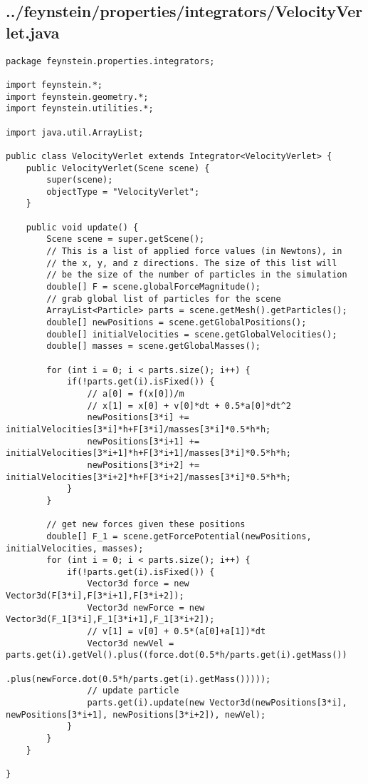 \subsection*{../feynstein/properties/integrators/VelocityVerlet.java}
\begin{lstlisting}
package feynstein.properties.integrators;

import feynstein.*;
import feynstein.geometry.*;
import feynstein.utilities.*;

import java.util.ArrayList;

public class VelocityVerlet extends Integrator<VelocityVerlet> {
    public VelocityVerlet(Scene scene) {
		super(scene);
		objectType = "VelocityVerlet";
    }
	
    public void update() {
		Scene scene = super.getScene();
		// This is a list of applied force values (in Newtons), in 
		// the x, y, and z directions. The size of this list will
		// be the size of the number of particles in the simulation
		double[] F = scene.globalForceMagnitude();
		// grab global list of particles for the scene
		ArrayList<Particle> parts = scene.getMesh().getParticles();
		double[] newPositions = scene.getGlobalPositions();
		double[] initialVelocities = scene.getGlobalVelocities();
		double[] masses = scene.getGlobalMasses();
		
		for (int i = 0; i < parts.size(); i++) {
			if(!parts.get(i).isFixed()) {
				// a[0] = f(x[0])/m
				// x[1] = x[0] + v[0]*dt + 0.5*a[0]*dt^2
				newPositions[3*i] += initialVelocities[3*i]*h+F[3*i]/masses[3*i]*0.5*h*h;
				newPositions[3*i+1] += initialVelocities[3*i+1]*h+F[3*i+1]/masses[3*i]*0.5*h*h;
				newPositions[3*i+2] += initialVelocities[3*i+2]*h+F[3*i+2]/masses[3*i]*0.5*h*h;
			}
		}
		
		// get new forces given these positions
		double[] F_1 = scene.getForcePotential(newPositions, initialVelocities, masses);
		for (int i = 0; i < parts.size(); i++) {
			if(!parts.get(i).isFixed()) {
				Vector3d force = new Vector3d(F[3*i],F[3*i+1],F[3*i+2]);
				Vector3d newForce = new Vector3d(F_1[3*i],F_1[3*i+1],F_1[3*i+2]);
				// v[1] = v[0] + 0.5*(a[0]+a[1])*dt
				Vector3d newVel = parts.get(i).getVel().plus((force.dot(0.5*h/parts.get(i).getMass())
															  .plus(newForce.dot(0.5*h/parts.get(i).getMass()))));
				// update particle
				parts.get(i).update(new Vector3d(newPositions[3*i], newPositions[3*i+1], newPositions[3*i+2]), newVel);
			}
		}
    }

}\end{lstlisting}

